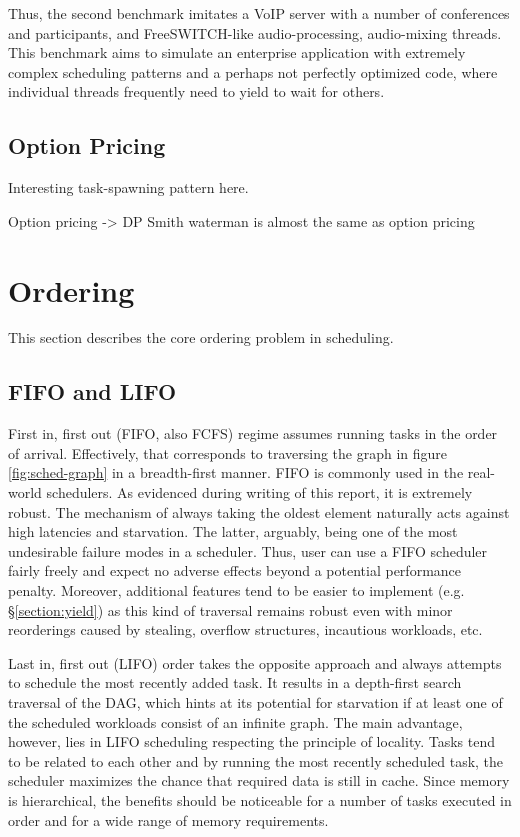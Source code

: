 \documentclass[12pt,a4paper,twoside]{report}
\begin{document}
Thus, the second benchmark imitates a VoIP server with a number of conferences and participants, and FreeSWITCH-like audio-processing, audio-mixing threads. This benchmark aims to simulate an enterprise application with extremely complex scheduling patterns and a perhaps not perfectly optimized code, where individual threads frequently need to yield to wait for others.

\subsection{Option Pricing}
\label{section:bench-option-pricing}

Interesting task-spawning pattern here.

Option pricing -> DP
Smith waterman is almost the same as option pricing  

\section{Ordering}
\label{section:approaches}
This section describes the core ordering problem in scheduling.

\subsection{FIFO and LIFO}
\label{section:ordering}
First in, first out (FIFO, also FCFS) regime assumes running tasks in the order of arrival. Effectively, that corresponds to traversing the graph in figure \ref{fig:sched-graph} in a breadth-first manner. FIFO is commonly used in the real-world schedulers. As evidenced during writing of this report, it is extremely robust. The mechanism of always taking the oldest element naturally acts against high latencies and starvation. The latter, arguably, being one of the most undesirable failure modes in a scheduler. Thus, user can use a FIFO scheduler fairly freely and expect no adverse effects beyond a potential performance penalty. Moreover, additional features tend to be easier to implement (e.g. \S\ref{section:yield}) as this kind of traversal remains robust even with minor reorderings caused by stealing, overflow structures, incautious workloads, etc.

Last in, first out (LIFO) order takes the opposite approach and always attempts to schedule the most recently added task. It results in a depth-first search traversal of the DAG, which hints at its potential for starvation if at least one of the scheduled workloads consist of an infinite graph. The main advantage, however, lies in LIFO scheduling respecting the principle of locality. Tasks tend to be related to each other and by running the most recently scheduled task, the scheduler maximizes the chance that required data is still in cache. Since memory is hierarchical, the benefits should be noticeable for a number of tasks executed in order and for a wide range of memory requirements. 
\end{document}

